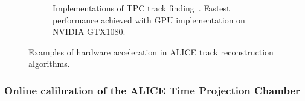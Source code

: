 \begin{figure}[h!]
\begin{subfigure}[b]{0.505\linewidth}
        \caption{Implementations of TPC track finding~\cite{alice-trigger-run3}. Fastest performance achieved with GPU implementation on NVIDIA GTX1080.}
        \label{alice-gpu-track}
    \end{subfigure}
    \caption{Examples of hardware acceleration in ALICE track reconstruction algorithms.}
\end{figure}

\subsubsection{Online calibration of the ALICE Time Projection Chamber}
\label{alice-tpc}

